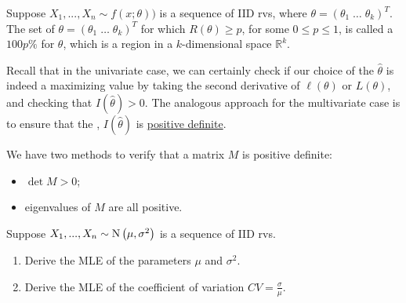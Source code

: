 \documentclass[notoc,notitlepage]{tufte-book}
\begin{document}
\begin{defn}
\label{defn:likelihood_region_multivariate}
  Suppose $X_1, ..., X_n \sim f(x; \theta))$ is a sequence of IID rvs, where $\theta = (\theta_1 \; \hdots \; \theta_k)^T$. The set of $\theta = (\theta_1 \; \hdots \; \theta_k)^T$ for which $R(\theta) \geq p$, for some $0 \leq p \leq 1$, is called a $100p\%$  for $\theta$, which is a region in a $k$-dimensional space $\mathbb{R}^k$.
\end{defn}

\begin{note}
  Recall that in the univariate case, we can certainly check if our choice of the $\hat{\theta}$ is indeed a maximizing value by taking the second derivative of $\ell(\theta)$ or $L(\theta)$, and checking that $I(\hat{\theta}) > 0$. The analogous approach for the multivariate case is to ensure that the , $I(\hat{\theta})$ is \href{https://en.wikipedia.org/wiki/Positive-definite_matrix}{positive definite}.

  We have two methods to verify that a matrix $M$ is positive definite:
  \begin{itemize}
    \item $\det M > 0$;
    \item eigenvalues of $M$ are all positive.
  \end{itemize}
\end{note}

\begin{eg}\label{eg:6_12_pt1}
  Suppose $X_1, ..., X_n \sim \operatorname{N}\left( \mu, \sigma^2 \right)$ is a sequence of IID rvs.
  \begin{enumerate}
    \item Derive the MLE of the parameters $\mu$ and $\sigma^2$.
    \item Derive the MLE of the coefficient of variation $CV = \frac{\sigma}{\mu}$.
  \end{enumerate}
\end{eg}
\end{document}
